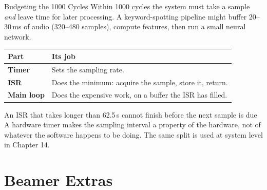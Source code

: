 \documentclass[9pt,aspectratio=169,xcolor=table]{beamer}
\begin{document}
\begin{frame}{Budgeting the 1000 Cycles}
    \leavevmode
    Within 1000 cycles the system must take a sample \emph{and} leave time for later processing. A keyword-spotting pipeline might buffer 20--30\,ms of audio (320--480 samples), compute features, then run a small neural network.

    \vspace{3mm}
    \begin{center}
    {\small
    \striped
    \begin{tabular}{@{}l R{.6\textwidth}@{}}
        \toprule
        \textbf{Part} & \textbf{Its job} \\
        \midrule
        \textbf{Timer} & Sets the sampling rate. \\
        \textbf{ISR} & Does the minimum: acquire the sample, store it, return. \\
        \textbf{Main loop} & Does the expensive work, on a buffer the ISR has filled. \\
        \bottomrule
    \end{tabular}}
    \end{center}

    \vspace{3mm}
    \begin{block}{An ISR that takes longer than 62.5\,\textmu s cannot finish before the next sample is due}
        A hardware timer makes the sampling interval a property of the \alert{hardware}, not of whatever the software happens to be doing. The same split is used at system level in Chapter 14.
    \end{block}
\end{frame}


\section{Beamer Extras}

\end{document}
